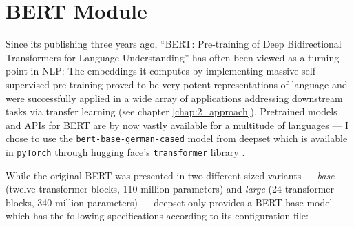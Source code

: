 \begin{landscape}\centering
\end{landscape}


\section{BERT Module}

Since its publishing three years ago, ``BERT: Pre-training of Deep Bidirectional Transformers
for Language Understanding'' \citep{devlin2018bert} has often been viewed as a turning-point
in NLP: The embeddings it computes by implementing massive self-supervised pre-training
proved to be very potent representations of language and were successfully applied in a
wide array of applications addressing downstream tasks via transfer learning (see chapter
\ref{chap:2_approach}). Pretrained models and APIs for BERT are by now vastly available
for a multitude of languages --- I chose to use the \texttt{bert-base-german-cased} model
from deepset which is available in \texttt{pyTorch}
\citep{paszke2019pytorch} through \href{https://huggingface.co}{hugging face}'s
\texttt{transformer} library \cite{wolf2019transformers}.

While the original BERT was presented in two different sized variants --- \emph{base}
(twelve transformer blocks, 110 million parameters) and \emph{large} (24 transformer
blocks, 340 million parameters) --- deepset only provides a BERT base model which has
the following specifications according to its configuration file:

